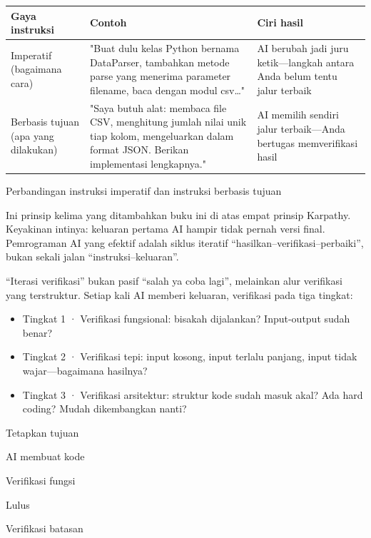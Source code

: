 \begin{center}
\begin{tabularx}{\linewidth}{|X|X|X|}
\hline
\textbf{Gaya instruksi} & \textbf{Contoh} & \textbf{Ciri hasil} \tabularnewline
\hline
Imperatif (bagaimana cara) & "Buat dulu kelas Python bernama DataParser, tambahkan metode parse yang menerima parameter filename, baca dengan modul csv…" & AI berubah jadi juru ketik—langkah antara Anda belum tentu jalur terbaik \tabularnewline
Berbasis tujuan (apa yang dilakukan) & "Saya butuh alat: membaca file CSV, menghitung jumlah nilai unik tiap kolom, mengeluarkan dalam format JSON. Berikan implementasi lengkapnya." & AI memilih sendiri jalur terbaik—Anda bertugas memverifikasi hasil \tabularnewline
\hline
\end{tabularx}
\end{center}

\begin{center}\small\color{gray}Perbandingan instruksi imperatif dan instruksi berbasis tujuan\end{center}


Ini prinsip kelima yang ditambahkan buku ini di atas empat prinsip Karpathy. Keyakinan intinya: keluaran pertama AI hampir tidak pernah versi final. Pemrograman AI yang efektif adalah siklus iteratif “hasilkan–verifikasi–perbaiki”, bukan sekali jalan “instruksi–keluaran”.

“Iterasi verifikasi” bukan pasif “salah ya coba lagi”, melainkan alur verifikasi yang terstruktur. Setiap kali AI memberi keluaran, verifikasi pada tiga tingkat:

\begin{itemize}
  \item Tingkat 1 · Verifikasi fungsional: bisakah dijalankan? Input-output sudah benar?
  \item Tingkat 2 · Verifikasi tepi: input kosong, input terlalu panjang, input tidak wajar—bagaimana hasilnya?
  \item Tingkat 3 · Verifikasi arsitektur: struktur kode sudah masuk akal? Ada hard coding? Mudah dikembangkan nanti?
\end{itemize}

Tetapkan tujuan

AI membuat kode

Verifikasi fungsi

Lulus

Verifikasi batasan

